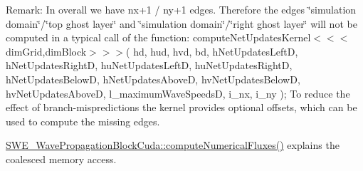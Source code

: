 Remark\-: In overall we have nx+1 / ny+1 edges. Therefore the edges \char`\"{}simulation domain\char`\"{}/\char`\"{}top ghost layer\char`\"{} and \char`\"{}simulation domain\char`\"{}/\char`\"{}right ghost layer\char`\"{} will not be computed in a typical call of the function\-: compute\-Net\-Updates\-Kernel$<$$<$$<$dim\-Grid,dim\-Block$>$$>$$>$( hd, hud, hvd, bd, h\-Net\-Updates\-Left\-D, h\-Net\-Updates\-Right\-D, hu\-Net\-Updates\-Left\-D, hu\-Net\-Updates\-Right\-D, h\-Net\-Updates\-Below\-D, h\-Net\-Updates\-Above\-D, hv\-Net\-Updates\-Below\-D, hv\-Net\-Updates\-Above\-D, l\-\_\-maximum\-Wave\-Speeds\-D, i\-\_\-nx, i\-\_\-ny ); To reduce the effect of branch-\/mispredictions the kernel provides optional offsets, which can be used to compute the missing edges.

\hyperlink{classSWE__WavePropagationBlockCuda_a8a89bf61b9fc4433652f400ca8e564ed}{S\-W\-E\-\_\-\-Wave\-Propagation\-Block\-Cuda\-::compute\-Numerical\-Fluxes()} explains the coalesced memory access.


